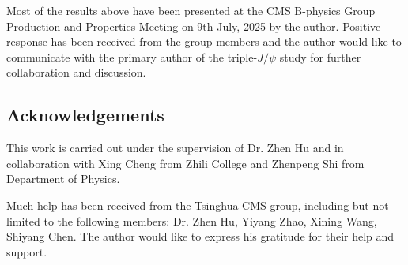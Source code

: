 \documentclass[10pt,twocolumn]{article}
\begin{document}
Most of the results above have been presented at the CMS B-physics Group Production and Properties Meeting on 9th July, 2025 by the author. Positive response has been received from the group members and the author would like to communicate with the primary author of the triple-$J/\psi$ study for further collaboration and discussion.

\subsection{Acknowledgements}

This work is carried out under the supervision of Dr. Zhen Hu and in collaboration with Xing Cheng from Zhili College and Zhenpeng Shi from Department of Physics.

Much help has been received from the Tsinghua CMS group, including but not limited to the following members: Dr. Zhen Hu, Yiyang Zhao, Xining Wang, Shiyang Chen. The author would like to express his gratitude for their help and support.



\end{document}
